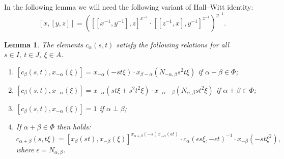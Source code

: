 \documentclass[oneside, 8pt]{amsart}
\newtheorem{lemma}{Lemma}
\theoremstyle{remark}
\theoremstyle{definition}
\numberwithin{equation}{section}
\begin{document}
In the following lemma we will need the following variant of Hall--Witt identity:
\begin{equation} \label{HW-variant} [x, [ y, z]] = \left([[ x^{-1}, y^{-1}], z] ^ {x^{-1}} \cdot  [[ z^{-1}, x], y^{-1}] ^ {z^{-1}}\right)^{y^{-1}}.\end{equation}

\begin{lemma} \label{Crels}
The elements $c_\alpha(s, t)$ satisfy the following relations for all $s\in I,\ t\in J,\ \xi\in A$.
 \begin{enumerate}
  \item \label{C1} $[c_\beta(s, t), x_{-\alpha}(\xi)] = x_{-\alpha}(- st\xi) \cdot x_{\beta-\alpha}(N_{-\alpha,\beta}s^2t\xi)$ if $\alpha-\beta \in \Phi$;
  \item \label{C2} $[c_\beta(s, t), x_{-\alpha}(\xi)] = x_{-\alpha}(st\xi + s^2t^2\xi) \cdot x_{-\alpha-\beta}(N_{\alpha, \beta}st^2\xi)$ if $\alpha+\beta \in \Phi$;
  \item \label{C3} $[c_\beta(s, t), x_{-\alpha}(\xi)] = 1$ if $\alpha \perp \beta$;
  \item \label{C4} If $\alpha+\beta\in\Phi$ then holds:
  \[c_{\alpha+\beta}(s, t\xi) = [x_{\beta}(st), x_{-\beta}(\xi)] ^ {x_{\alpha+\beta}(-s) x_{-\alpha}(\epsilon t)} \cdot c_{\alpha}(\epsilon s\xi, -\epsilon t)^{-1} \cdot x_{-\beta}(-st\xi^2),\]
  where $\epsilon = N_{\alpha,\beta}$.
 \end{enumerate}
\end{lemma}
\end{document}
